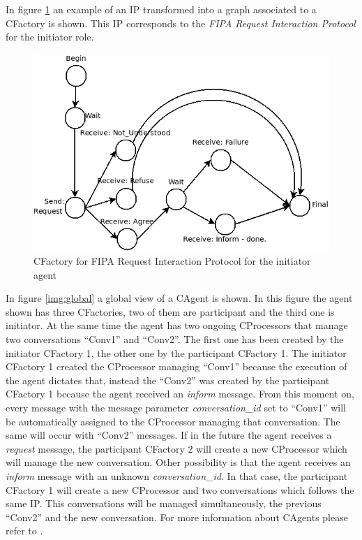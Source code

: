 In figure \ref{img:requestIni} an example of an IP transformed into a graph associated to a CFactory is shown. This IP corresponds to the \textit{FIPA Request Interaction Protocol} \cite{fipa02} for the initiator role.

\begin{figure}
\centering
\includegraphics[scale=0.5]{ProgrammingAgents/images/fiparequestIni}
\caption{CFactory for FIPA Request Interaction Protocol for the initiator agent}
\label{img:requestIni}
\end{figure}

In figure \ref{img:global} a global view of a CAgent is shown. In this figure the agent shown has three CFactories, two of them are participant and the third one is initiator. At the same time the agent has two ongoing CProcessors that manage two conversations ``Conv1'' and ``Conv2''. The first one has been created by the initiator CFactory 1, the other one by the participant CFactory 1. The initiator CFactory 1 created the CProcessor managing ``Conv1'' because the execution of the agent dictates that, instead the ``Conv2'' was created by the participant CFactory 1 because the agent received an \emph{inform} message. From this moment on, every message with the message parameter \emph{conversation\_id} set to ``Conv1'' will be automatically assigned to the CProcessor managing that conversation. The same will occur with ``Conv2'' messages. If in the future the agent receives a \emph{request} message, the participant CFactory 2 will create a new CProcessor which will manage the new conversation. Other possibility is that the  agent receives an \emph{inform} message with an unknown \emph{conversation\_id}. In that case, the participant CFactory 1 will create a new CProcessor and two conversations which follows the same IP. This conversations will be managed simultaneously, the previous ``Conv2'' and the new conversation. For more information about CAgents please refer to \cite{Fogues10}.

